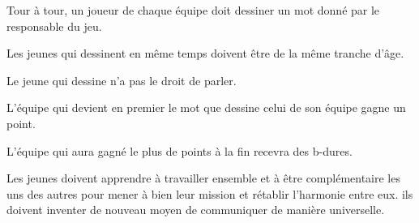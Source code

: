 \documentclass{grand-jeu}
\begin{document}
\begin{liste-materiel}
\end{liste-materiel}

\begin{regles}
Tour à tour, un joueur de chaque équipe doit dessiner un mot donné par le responsable du jeu. 

Les jeunes qui dessinent en même temps doivent être de la même tranche d'âge. 

Le jeune qui dessine n'a pas le droit de parler. 

L'équipe qui devient en premier le mot que dessine celui de son équipe gagne un point. 

L’équipe qui aura gagné le plus de points à la fin recevra des b-dures.
\end{regles}

\begin{imaginaire}
Les jeunes doivent apprendre à travailler ensemble et à être complémentaire les uns des autres pour mener à bien leur mission et rétablir l'harmonie entre eux. ils doivent inventer de nouveau moyen de communiquer de manière universelle. 
\end{imaginaire}

\begin{moments-stop}
\end{moments-stop}
\end{document}
